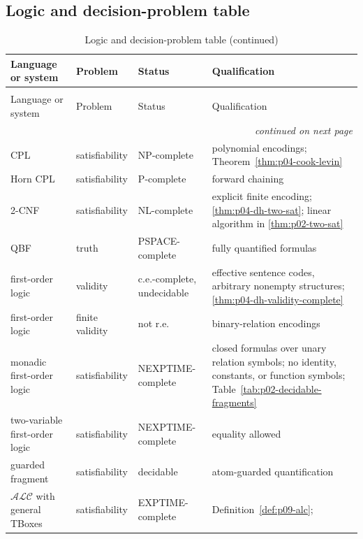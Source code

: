 \subsection{Logic and decision-problem table}
\label{sec:p14-decision-table}

\begin{longtable}{@{}p{}p{}p{}p{}@{}}
\caption{Logic and decision-problem table}\\
\toprule
Language or system & Problem & Status & Qualification \\
\midrule
\endfirsthead
\caption[]{Logic and decision-problem table (continued)}\\
\toprule
Language or system & Problem & Status & Qualification \\
\midrule
\endhead
\midrule\multicolumn{4}{r}{\emph{continued on next page}}\\
\endfoot
\endlastfoot
CPL & satisfiability & NP-complete & polynomial encodings;
Theorem~\ref{thm:p04-cook-levin} \\
Horn CPL & satisfiability & P-complete & forward chaining \cite{DowlingGallier1984} \\
2-CNF & satisfiability & NL-complete & explicit finite encoding; \cref{thm:p04-dh-two-sat}; linear algorithm in \cref{thm:p02-two-sat} \\
QBF & truth & PSPACE-complete & fully quantified formulas \cite{Stockmeyer1976} \\
first-order logic & validity & c.e.-complete, undecidable & effective sentence codes, arbitrary nonempty structures; \cref{thm:p04-dh-validity-complete} \\
first-order logic & finite validity & not r.e. & binary-relation encodings \cite{Trakhtenbrot1950} \\
monadic first-order logic & satisfiability & NEXPTIME-complete & closed formulas
over unary relation symbols; no identity, constants, or function symbols;
Table~\ref{tab:p02-decidable-fragments} \cite{Lewis1980} \\
two-variable first-order logic & satisfiability & NEXPTIME-complete & equality allowed \cite{GradelKolaitisVardi1997} \\
guarded fragment & satisfiability & decidable & atom-guarded quantification \cite{Gradel1999} \\
\(\mathcal{ALC}\) with general TBoxes & satisfiability & EXPTIME-complete & Definition~\ref{def:p09-alc}; \cite{BaaderHorrocksLutzSattler2017} \\

\end{longtable}
